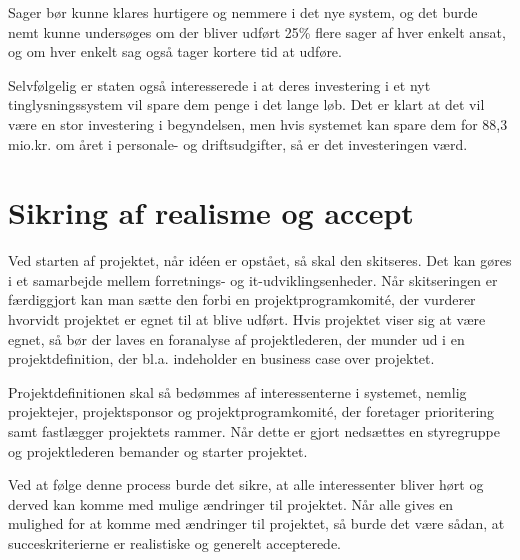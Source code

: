 \documentclass[10pt,a4paper,danish]{article}
\begin{document}
Sager bør kunne klares hurtigere og nemmere i det nye system, og det burde nemt kunne undersøges om der bliver udført 25\% flere sager af hver enkelt ansat, og om hver enkelt sag også tager kortere tid at udføre.

Selvfølgelig er staten også interesserede i at deres investering i et nyt tinglysningssystem vil spare dem penge i det lange løb. Det er klart at det vil være en stor investering i begyndelsen, men hvis systemet kan spare dem for 88,3 mio.kr. om året i personale- og driftsudgifter, så er det investeringen værd.


\section{Sikring af realisme og accept}
Ved starten af projektet, når idéen er opstået, så skal den skitseres. Det kan gøres i et samarbejde mellem forretnings- og it-udviklingsenheder. Når skitseringen er færdiggjort kan man sætte den forbi en projektprogramkomité, der vurderer hvorvidt projektet er egnet til at blive udført. Hvis projektet viser sig at være egnet, så bør der laves en foranalyse af projektlederen, der munder ud i en projektdefinition, der bl.a. indeholder en business case over projektet. 

Projektdefinitionen skal så bedømmes af interessenterne i 
systemet, nemlig projektejer, projektsponsor og projektprogramkomité, der foretager prioritering samt fastlægger projektets rammer. Når dette er gjort nedsættes en styregruppe og projektlederen bemander og starter projektet. 

Ved at følge denne process burde det sikre, at alle interessenter bliver hørt og derved kan komme med mulige ændringer til projektet. Når alle gives en mulighed for at komme med ændringer til projektet, så burde det være sådan, at succeskriterierne er realistiske og generelt accepterede.
\end{document}
